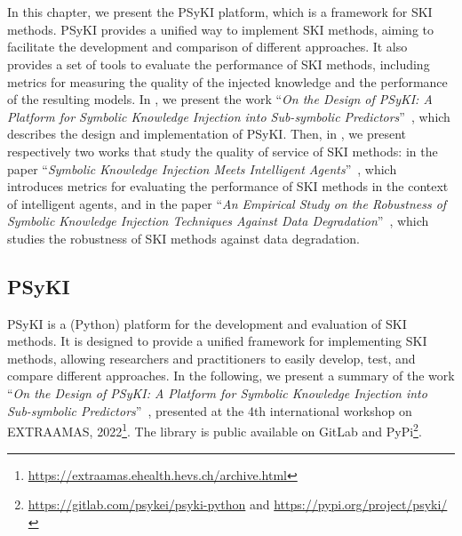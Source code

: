 
\chapter[Platform for symbolic knowledge injection]{}
\label{ch:psyki}
\minitoc

In this chapter, we present the \Gls{PSyKI} platform, which is a framework for \gls{SKI} methods.
%
\Gls{PSyKI} provides a unified way to implement \gls{SKI} methods, aiming to facilitate the development and comparison of different approaches.
%
It also provides a set of tools to evaluate the performance of \gls{SKI} methods, including metrics for measuring the quality of the injected knowledge and the performance of the resulting models.
%
In , we present the work ``\emph{On the Design of PSyKI: A Platform for Symbolic Knowledge Injection into Sub-symbolic Predictors}''~\cite{DBLP:conf/atal/MagniniCO22}, which describes the design and implementation of \gls{PSyKI}.
%
Then, in , we present respectively two works that study the quality of service of \gls{SKI} methods:
%
in  the paper ``\emph{Symbolic Knowledge Injection Meets Intelligent Agents}''~\cite{DBLP:journals/aamas/AgiolloRMCO23},
%
which introduces metrics for evaluating the performance of \gls{SKI} methods in the context of intelligent agents,
%
and in  the paper ``\emph{An Empirical Study on the Robustness of Symbolic Knowledge Injection Techniques Against Data Degradation}''~\cite{DBLP:conf/woa/RafanelliMACO24},
%
which studies the robustness of \gls{SKI} methods against data degradation.


\section{PSyKI}\label{sec:psyki}
%
\Gls{PSyKI} is a (Python) platform for the development and evaluation of \gls{SKI} methods.
%
It is designed to provide a unified framework for implementing \gls{SKI} methods, allowing researchers and practitioners to easily develop, test, and compare different approaches.
%
In the following, we present a summary of the work ``\emph{On the Design of PSyKI: A Platform for Symbolic Knowledge Injection into Sub-symbolic Predictors}''~\cite{DBLP:conf/atal/MagniniCO22}, presented at the 4th international workshop on \gls{EXTRAAMAS}, 2022\footnote{\url{https://extraamas.ehealth.hevs.ch/archive.html}}.
%
The library is public available on GitLab and PyPi\footnote{\url{https://gitlab.com/psykei/psyki-python} and \url{https://pypi.org/project/psyki/}}.


